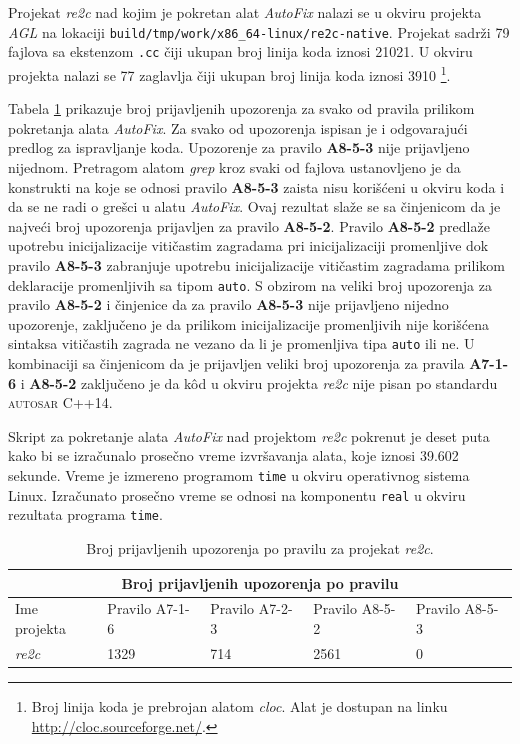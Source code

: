 \documentclass[12pt,oneside]{memoir}
\begin{document}
Projekat \textit{re2c} nad kojim je pokretan alat \textit{AutoFix} nalazi se u okviru projekta \textit{AGL} na lokaciji \texttt{build/tmp/work/x86\_64-linux/re2c-native}. Projekat sadr\v{z}i 79 fajlova sa ekstenzom \texttt{.cc} \v{c}iji ukupan broj linija koda iznosi 21021. U okviru projekta
nalazi se 77 zaglavlja \v{c}iji ukupan broj linija koda iznosi 3910 \footnote{Broj linija koda je prebrojan alatom \textit{cloc}. Alat je dostupan na linku \url{http://cloc.sourceforge.net/}.}. \par
Tabela \ref{fig:re2c} prikazuje broj prijavljenih upozorenja za svako od pravila prilikom pokretanja alata \textit{AutoFix}.
Za svako od upozorenja ispisan je i odgovaraju\'{c}i predlog za ispravljanje koda. Upozorenje za pravilo \textbf{A8-5-3} nije prijavljeno nijednom. Pretragom
alatom \textit{grep} kroz svaki od fajlova ustanovljeno je da konstrukti na koje se odnosi pravilo \textbf{A8-5-3} zaista nisu kori\v{s}\'{c}eni u okviru koda i da se ne radi o gre\v{s}ci u alatu \textit{AutoFix}. Ovaj rezultat sla\v{z}e se sa \v{c}injenicom da je najve\'{c}i broj upozorenja prijavljen za pravilo \textbf{A8-5-2}. Pravilo \textbf{A8-5-2} predla\v{z}e upotrebu inicijalizacije viti\v{c}astim zagradama pri inicijalizaciji promenljive dok pravilo \textbf{A8-5-3} zabranjuje upotrebu inicijalizacije viti\v{c}astim zagradama prilikom deklaracije promenljivih sa tipom \texttt{auto}. S obzirom na veliki broj upozorenja za pravilo \textbf{A8-5-2} i \v{c}injenice da za pravilo \textbf{A8-5-3} nije prijavljeno nijedno upozorenje, zaklju\v{c}eno je da prilikom inicijalizacije promenljivih nije kori\v{s}\'{c}ena sintaksa viti\v{c}astih zagrada ne vezano da li je promenljiva
tipa \texttt{auto} ili ne. U kombinaciji sa \v{c}injenicom da je prijavljen veliki broj upozorenja za pravila \textbf{A7-1-6} i \textbf{A8-5-2} zaklju\v{c}eno je da k\^{o}d u okviru projekta \textit{re2c} nije pisan po standardu \textsc{autosar} C++14. \par
Skript za pokretanje alata \textit{AutoFix} nad projektom \textit{re2c} pokrenut je deset puta kako bi se izra\v{c}unalo prose\v{c}no vreme izvr\v{s}avanja alata, koje iznosi 39.602 sekunde. Vreme je izmereno programom \texttt{time} u okviru operativnog sistema Linux. Izra\v{c}unato prose\v{c}no vreme se odnosi na komponentu \texttt{real} u okviru rezultata programa \texttt{time}.
\begin{table}[!h]
\begin{center}
\begin{tabular}{ |p{3cm}||p{2cm}|p{2cm}|p{2cm}|p{2cm}|  }
 \hline
 \multicolumn{5}{|c|}{Broj prijavljenih upozorenja po pravilu} \\
 \hline
 Ime projekta & Pravilo A7-1-6 & Pravilo A7-2-3 & Pravilo A8-5-2 & Pravilo A8-5-3\\
 \hline
 \textit{re2c}   & 1329            & 714             & 2561            & 0\\
 \hline
\end{tabular}
\caption{Broj prijavljenih upozorenja po pravilu za projekat \textit{re2c}.}
\label{fig:re2c}
\end{center}
\end{table}
\end{document}
